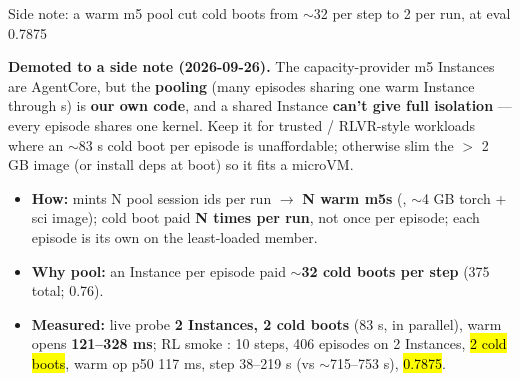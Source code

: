\begin{frame}{Side note: a warm m5 pool cut cold boots from $\sim$32 per step to 2 per run, at eval 0.7875}
{\footnotesize\textbf{Demoted to a side note (2026-09-26).} The capacity-provider m5 Instances are AgentCore, but the \textbf{pooling} (many episodes sharing one warm Instance through s) is \textbf{our own code}, and a shared Instance \textbf{can't give full isolation} --- every episode shares one kernel. Keep it for trusted / RLVR-style workloads where an $\sim$83 s cold boot per episode is unaffordable; otherwise slim the $>$ 2 GB image (or install deps at boot) so it fits a microVM.\par}
\vspace{2mm}
\begin{itemize}\footnotesize\setlength{\itemsep}{1.5mm}
\item \textbf{How:}  mints N pool session ids per run $\rightarrow$ \textbf{N warm m5s} (, $\sim$4 GB torch + sci image); cold boot paid \textbf{N times per run}, not once per episode; each episode is its own  on the least-loaded member.
\item \textbf{Why pool:} an Instance per episode paid $\sim$\textbf{32 cold boots per step} (375 total;  0.76).
\item \textbf{Measured:} live probe \textbf{2 Instances, 2 cold boots} (83 s, in parallel), warm opens \textbf{121--328 ms}; RL smoke : 10 steps, 406 episodes on 2 Instances, \hl{2 cold boots}, warm op p50 117 ms, step 38--219 s (vs $\sim$715--753 s), \hl{ 0.7875}.
\end{itemize}
\end{frame}

